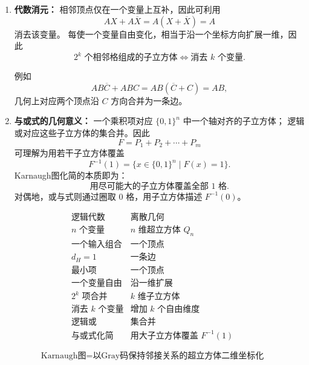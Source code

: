 \documentclass[UTF8,fontset=fandol,zihao=5]{ctexart}
\begin{document}
\begin{enumerate}
\begin{methodbox}[Karnaugh图的数学结构]
\begin{enumerate}
    若其中 $r$ 个自由变量属于行坐标，其余 $k-r$ 个属于列坐标，则该子立方体在Karnaugh图中表现为
    \[
        2^r\times 2^{k-r}
    \]
    的矩形，因此其面积恒为
    \[
        \boxed{2^k}.
    \]

    \item \textbf{代数消元：}
    相邻顶点仅在一个变量上互补，因此可利用
    \[
        AX+A\overline{X}
        =A(X+\overline{X})
        =A
    \]
    消去该变量。
    每使一个变量自由变化，相当于沿一个坐标方向扩展一维，因此
    \[
        \boxed{
        2^k\text{ 个相邻格组成的子立方体}
        \Longleftrightarrow
        \text{消去 }k\text{ 个变量}
        }.
    \]

    例如
    \[
        AB\overline{C}+ABC
        =AB(\overline{C}+C)
        =AB,
    \]
    几何上对应两个顶点沿 $C$ 方向合并为一条边。

    \item \textbf{与或式的几何意义：}
    一个乘积项对应 $\{0,1\}^n$ 中一个轴对齐的子立方体；
    逻辑或对应这些子立方体的集合并。因此
    \[
        F=P_1+P_2+\cdots+P_m
    \]
    可理解为用若干子立方体覆盖
    \[
        F^{-1}(1)
        =\{x\in\{0,1\}^n\mid F(x)=1\}.
    \]
    Karnaugh图化简的本质即为：
    \[
        \boxed{
        \text{用尽可能大的子立方体覆盖全部 }1\text{ 格}
        }.
    \]
    对偶地，或与式则通过圈取 $0$ 格，用子立方体描述
    $F^{-1}(0)$。
\end{enumerate}

\[
\boxed{
\begin{array}{c|c}
\text{逻辑代数} & \text{离散几何} \\ \hline
n\text{ 个变量} & n\text{ 维超立方体 }Q_n\\
\text{一个输入组合} & \text{一个顶点}\\
d_H=1 & \text{一条边}\\
\text{最小项} & \text{一个顶点}\\
\text{一个变量自由} & \text{沿一维扩展}\\
2^k\text{ 项合并} & k\text{ 维子立方体}\\
\text{消去 }k\text{ 个变量} & \text{增加 }k\text{ 个自由维度}\\
\text{逻辑或} & \text{集合并}\\
\text{与或式化简} & \text{用大子立方体覆盖 }F^{-1}(1)
\end{array}}
\]

\[
\boxed{
\text{Karnaugh图}
=
\text{以Gray码保持邻接关系的超立方体二维坐标化}
}
\]

\end{methodbox}

\end{enumerate}
\end{document}
